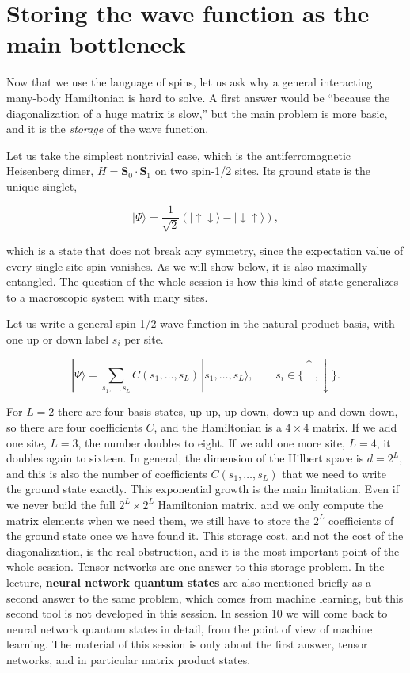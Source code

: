 \section{Storing the wave function as the main bottleneck}

Now that we use the language of spins, let us ask why a general interacting many-body Hamiltonian is
hard to solve. A first answer would be ``because the diagonalization of a huge matrix is slow,'' but
the main problem is more basic, and it is the \emph{storage} of the wave function.

Let us take the simplest nontrivial case, which is the antiferromagnetic Heisenberg dimer, $H =
\mathbf{S}_0\cdot
\mathbf{S}_1$ on two spin-1/2 sites. Its ground state is the unique singlet,

\begin{equation}
|\Psi\rangle = \frac{1}{\sqrt{2}}\left(|{\uparrow\downarrow}\rangle -
|{\downarrow\uparrow}\rangle\right),
\end{equation}

which is a state that does not break any symmetry, since the expectation value of every single-site
spin vanishes. As we will show below, it is also maximally entangled. The question of the whole
session is how this kind of state generalizes to a macroscopic system with many sites.

Let us write a general spin-1/2 wave function in the natural product basis, with one up or down label
$s_i$ per site.

\begin{equation}
|\Psi\rangle = \sum_{s_1,\dots,s_L} C(s_1,\dots,s_L)\, |s_1,\dots,s_L\rangle, \qquad
s_i \in \{\uparrow,\downarrow\}.
\end{equation}

For $L=2$ there are four basis states, up-up, up-down, down-up and down-down, so there are four
coefficients $C$, and the Hamiltonian is a $4\times4$ matrix. If we add one site, $L=3$, the number
doubles to eight. If we add one more site, $L=4$, it doubles again to sixteen. In general, the
dimension of the Hilbert space is $d = 2^L$, and this is also the number of coefficients
$C(s_1,\dots,s_L)$ that we need to write the ground state exactly. This exponential growth is the
main limitation. Even if we never build the full $2^L\times2^L$ Hamiltonian matrix, and we only
compute the matrix elements when we need them, we still have to store the $2^L$ coefficients of the
ground state once we have found it. This storage cost, and not the cost of the diagonalization, is
the real obstruction, and it is the most important point of the whole session. Tensor networks are
one answer to this storage problem. In the lecture, \textbf{neural network quantum states} are also
mentioned briefly as a second answer to the same problem, which comes from machine learning, but
this second tool is not developed in this session. In session 10 we will come back to neural network
quantum states in detail, from the point of view of machine learning. The material of this session is
only about the first answer, tensor networks, and in particular matrix product states.

